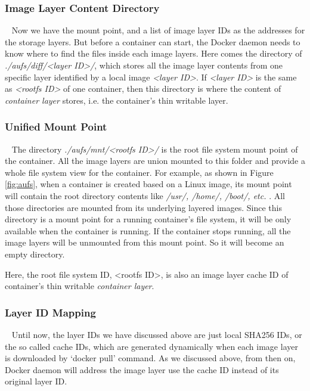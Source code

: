 
\smallbreak 
\subsubsection{Image Layer Content Directory}
~\smallbreak
Now we have the mount point, and a list of image layer IDs as the addresses for the storage layers. But before a container can start, the Docker daemon needs to know where to find the files inside each image layers. Here comes the directory of
 \textit{./aufs/diff/<layer ID>/}, which stores all the image layer contents from one specific layer identified by a local image \textit{<layer ID>}. If \textit{<layer ID>} is the same as \textit{<rootfs ID>} of one container, then this directory is where the content of \textit{container layer} stores, i.e. the container's thin writable layer. 

\smallbreak 
\subsubsection{Unified Mount Point} 
~\smallbreak
The directory \textit{./aufs/mnt/<rootfs ID>/ }  is the root file system mount point of the container. All the image layers are union mounted to this folder and provide a whole file system view for the container. For example, as shown in Figure \ref{fig:aufs}, when a container is created based on a Linux image, its mount point will contain the root directory contents like \textit{/usr/, /home/, /boot/, etc. }. All those directories are mounted from its underlying layered images. 
Since this directory is a mount point for a running container's file system, it will be only available when the container is running. If the container stops running, all the image layers will be unmounted from this mount point. So it will become an empty directory.

Here, the root file system ID, <rootfs ID>, is also an image layer cache ID of container's thin writable \textit{container layer}. 

\smallbreak  
\subsubsection{Layer ID Mapping}  \label{intro:aufs:layerIDMapping}
~\smallbreak
Until now, the layer IDs we have discussed above are just local SHA256 IDs, or the so called cache IDs, which are generated dynamically when each image layer is downloaded by `docker pull' command. As we discussed above, from then on, Docker daemon will address the image layer use the cache ID instead of its original layer ID.

